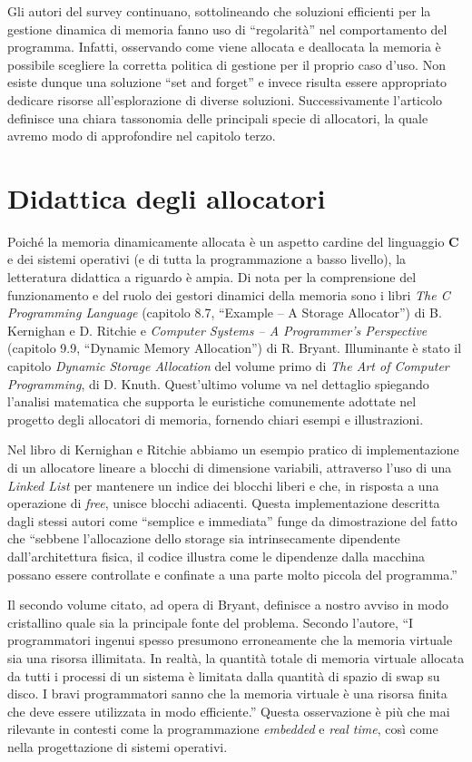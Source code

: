 Gli autori del survey continuano, sottolineando che soluzioni efficienti per la gestione dinamica di memoria fanno uso di ``regolarità'' nel comportamento del programma. Infatti, osservando come viene allocata e deallocata la memoria è possibile scegliere la corretta politica di gestione per il proprio caso d’uso. Non esiste dunque una soluzione ``set and forget'' e invece risulta essere appropriato dedicare risorse all’esplorazione di diverse soluzioni. Successivamente l’articolo definisce una chiara tassonomia delle principali specie di allocatori, la quale avremo modo di approfondire nel capitolo terzo.

\section{Didattica degli allocatori}

Poiché la memoria dinamicamente allocata è un aspetto cardine del linguaggio \textbf{C} e dei sistemi operativi (e di tutta la programmazione a basso livello), la letteratura didattica a riguardo è ampia. Di nota per la comprensione del funzionamento e del ruolo dei gestori dinamici della memoria sono i libri \textit{The C Programming Language} (capitolo 8.7, ``Example – A Storage Allocator'') di B. Kernighan e D. Ritchie e \textit{Computer Systems – A Programmer’s Perspective} (capitolo 9.9, ``Dynamic Memory Allocation'') di R. Bryant. Illuminante è stato il capitolo \textit{Dynamic Storage Allocation} del volume primo di \textit{The Art of Computer Programming}, di D. Knuth. Quest’ultimo volume va nel dettaglio spiegando l’analisi matematica che supporta le euristiche comunemente adottate nel progetto degli allocatori di memoria, fornendo chiari esempi e illustrazioni.

Nel libro di Kernighan e Ritchie abbiamo un esempio pratico di implementazione di un allocatore lineare a blocchi di dimensione variabili, attraverso l’uso di una \textit{Linked List} per mantenere un indice dei blocchi liberi e che, in risposta a una operazione di \textit{free}, unisce blocchi adiacenti. Questa implementazione descritta dagli stessi autori come ``semplice e immediata'' funge da dimostrazione del fatto che ``sebbene l’allocazione dello storage sia intrinsecamente dipendente dall’architettura fisica, il codice illustra come le dipendenze dalla macchina possano essere controllate e confinate a una parte molto piccola del programma.''

Il secondo volume citato, ad opera di Bryant, definisce a nostro avviso in modo cristallino quale sia la principale fonte del problema. Secondo l’autore, ``I programmatori ingenui spesso presumono erroneamente che la memoria virtuale sia una risorsa illimitata. In realtà, la quantità totale di memoria virtuale allocata da tutti i processi di un sistema è limitata dalla quantità di spazio di swap su disco. I bravi programmatori sanno che la memoria virtuale è una risorsa finita che deve essere utilizzata in modo efficiente.'' Questa osservazione è più che mai rilevante in contesti come la programmazione \textit{embedded} e \textit{real time}, così come nella progettazione di sistemi operativi.

